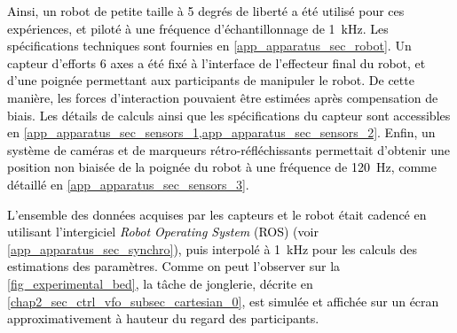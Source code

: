 \textcolor{black}{Ainsi, un robot de petite taille à 5 degrés de liberté a été utilisé pour ces expériences, et piloté à une fréquence d'échantillonnage de \SI{1}{\kilo\hertz}. Les spécifications techniques sont fournies en \cref{app_apparatus_sec_robot}. Un capteur d'efforts 6 axes a été fixé à l'interface de l'effecteur final du robot, et d'une poignée permettant aux participants de manipuler le robot. De cette manière, les forces d'interaction pouvaient être estimées après compensation de biais. Les détails de calculs ainsi que les spécifications du capteur sont accessibles en \cref{app_apparatus_sec_sensors_1,app_apparatus_sec_sensors_2}. Enfin, un système de caméras et de marqueurs rétro-réfléchissants permettait d'obtenir une position non biaisée de la poignée du robot à une fréquence de \SI{120}{\hertz}, comme détaillé en \cref{app_apparatus_sec_sensors_3}.}

\textcolor{black}{L'ensemble des données acquises par les capteurs et le robot était cadencé en utilisant l'intergiciel \textit{Robot Operating System} (ROS) (voir \cref{app_apparatus_sec_synchro}), puis interpolé à \SI{1}{\kilo\hertz} pour les calculs des estimations des paramètres. Comme on peut l'observer sur la \cref{fig_experimental_bed}, la tâche de jonglerie, décrite en \cref{chap2_sec_ctrl_vfo_subsec_cartesian_0}, est simulée et affichée sur un écran approximativement à hauteur du regard des participants.}

